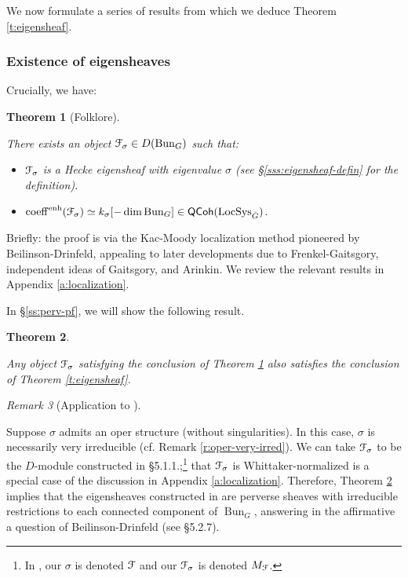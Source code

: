 \documentclass[reqno,11pt]{amsart}
\numberwithin{equation}{subsection}
\newtheorem{thm}{Theorem}[subsubsection]
\theoremstyle{remark}
\newtheorem{rem}[thm]{Remark}
\newcommand{\sF}{{\EuScript F}}
\newcommand{\on}{\operatorname}
\newcommand{\Bun}{\on{Bun}}
\newcommand{\LocSys}{\on{LocSys}}
\newcommand{\QCoh}{\mathsf{QCoh}}
\newcommand{\coeff}{\on{coeff}}
\newcommand{\enh}{\on{enh}}
\begin{document}
We now formulate a series of results from which we deduce
Theorem \ref{t:eigensheaf}.

\subsubsection{Existence of eigensheaves}

Crucially, we have:

\begin{thm}[Folklore]\label{t:aut-exists}

There exists an object $\sF_{\sigma} \in D(\Bun_G)$
such that:

\begin{itemize}

\item $\sF_{\sigma}$ is a Hecke eigensheaf with eigenvalue $\sigma$
(see \S \ref{sss:eigensheaf-defin} for the definition).

\item $\coeff^{\enh}(\sF_{\sigma}) \simeq k_{\sigma}[-\dim \Bun_G] \in 
\QCoh(\LocSys_{\check{G}})$.

\end{itemize}

\end{thm}

Briefly: the proof is via the Kac-Moody localization method pioneered
by Beilinson-Drinfeld, appealing to later developments
due to Frenkel-Gaitsgory, independent ideas of Gaitsgory, and Arinkin.
We review the relevant results in Appendix \ref{a:localization}.

In \S \ref{ss:perv-pf}, we will show the following result.

\begin{thm}\label{t:eigen->perv}

Any object $\sF_{\sigma}$ satisfying the conclusion of 
Theorem \ref{t:aut-exists} also satisfies the conclusion of
Theorem \ref{t:eigensheaf}.

\end{thm}

\begin{rem}[Application to \cite{hitchin}]\label{r:bd-irred}

Suppose $\sigma$ admits an oper structure (without singularities).
In this case, $\sigma$ is necessarily very irreducible 
(cf. Remark \ref{r:oper-very-irred}).
We can take $\sF_{\sigma}$ to be the $D$-module constructed in 
\cite{hitchin} \S 5.1.1.;\footnote{In \cite{hitchin}, our $\sigma$ is denoted
$\sF$ and our $\sF_{\sigma}$ is denoted $M_{\sF}$.} that
$\sF_{\sigma}$ is Whittaker-normalized is a special case of 
the discussion in Appendix \ref{a:localization}.
Therefore, Theorem \ref{t:eigen->perv} 
implies that the eigensheaves constructed in \cite{hitchin} 
are perverse sheaves with irreducible restrictions to each connected component
of $\Bun_G$, answering in the
affirmative a question of Beilinson-Drinfeld (see \cite{hitchin} \S 5.2.7).

\end{rem}
\end{document}
